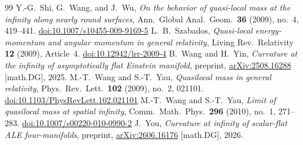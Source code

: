 \documentclass[10pt,a4paper]{amsart}
\begin{document}
\begin{thebibliography}{99}
 Y.-G.~Shi, G.~Wang, and J.~Wu, \emph{On the behavior of quasi-local mass at the infinity along nearly round surfaces}, Ann.\ Global Anal.\ Geom.\ \textbf{36} (2009), no.~4, 419--441. \href{https://doi.org/10.1007/s10455-009-9169-5}{doi:10.1007/s10455-009-9169-5}
 L.~B.~Szabados, \emph{Quasi-local energy-momentum and angular momentum in general relativity}, Living Rev.\ Relativity \textbf{12} (2009), Article~4. \href{https://doi.org/10.12942/lrr-2009-4}{doi:10.12942/lrr-2009-4}
 B.~Wang and H.~Yin, \emph{Curvature at the infinity of asymptotically flat Einstein manifold}, preprint, \href{https://arxiv.org/abs/2508.16288}{arXiv:2508.16288} [math.DG], 2025.
 M.-T.~Wang and S.-T.~Yau, \emph{Quasilocal mass in general relativity}, Phys.\ Rev.\ Lett.\ \textbf{102} (2009), no.~2, 021101. \href{https://doi.org/10.1103/PhysRevLett.102.021101}{doi:10.1103/PhysRevLett.102.021101}
 M.-T.~Wang and S.-T.~Yau, \emph{Limit of quasilocal mass at spatial infinity}, Comm.\ Math.\ Phys.\ \textbf{296} (2010), no.~1, 271--283. \href{https://doi.org/10.1007/s00220-010-0990-2}{doi:10.1007/s00220-010-0990-2}
 J.~You, \emph{Curvature at infinity of scalar-flat ALE four-manifolds}, preprint, \href{https://arxiv.org/abs/2606.16176}{arXiv:2606.16176} [math.DG], 2026.
\end{thebibliography}
\end{document}
